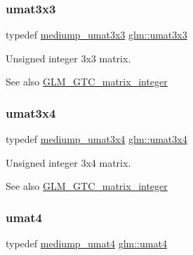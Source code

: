 \subsubsection{\texorpdfstring{umat3x3}{umat3x3}}
{\footnotesize\ttfamily typedef \hyperlink{group__gtc__matrix__integer_gac2563a9d45e3f6be0ceaf62b50a983f5}{mediump\+\_\+umat3x3} \hyperlink{group__gtc__matrix__integer_gab80b6501ba1b2c40119a0f2d256f4c97}{glm\+::umat3x3}}

Unsigned integer 3x3 matrix. \begin{DoxySeeAlso}{See also}
\hyperlink{group__gtc__matrix__integer}{G\+L\+M\+\_\+\+G\+T\+C\+\_\+matrix\+\_\+integer} 
\end{DoxySeeAlso}
\mbox{\label{group__gtc__matrix__integer_ga5410857d098a989a30b4017100bc2ff7}} 
\subsubsection{\texorpdfstring{umat3x4}{umat3x4}}
{\footnotesize\ttfamily typedef \hyperlink{group__gtc__matrix__integer_ga22e32b4dcd60655044ebbd30f50a2e67}{mediump\+\_\+umat3x4} \hyperlink{group__gtc__matrix__integer_ga5410857d098a989a30b4017100bc2ff7}{glm\+::umat3x4}}

Unsigned integer 3x4 matrix. \begin{DoxySeeAlso}{See also}
\hyperlink{group__gtc__matrix__integer}{G\+L\+M\+\_\+\+G\+T\+C\+\_\+matrix\+\_\+integer} 
\end{DoxySeeAlso}
\mbox{\label{group__gtc__matrix__integer_ga7ae562000d8a8d193e9f93cf51e2e113}} 
\subsubsection{\texorpdfstring{umat4}{umat4}}
{\footnotesize\ttfamily typedef \hyperlink{group__gtc__matrix__integer_ga0653e9571754f1e33203290aaf3dfc5d}{mediump\+\_\+umat4} \hyperlink{group__gtc__matrix__integer_ga7ae562000d8a8d193e9f93cf51e2e113}{glm\+::umat4}}

